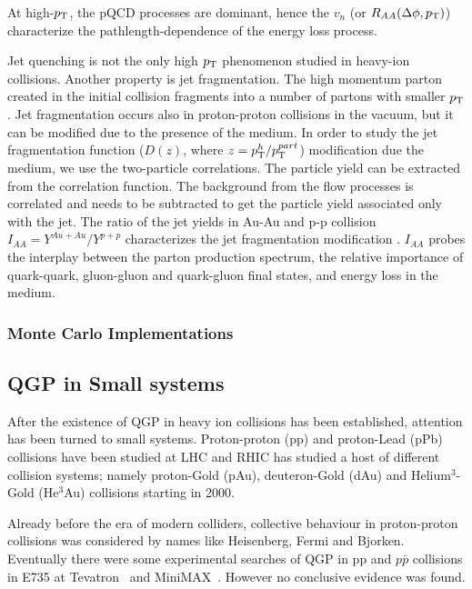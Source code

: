 At high-$p_{\rm T}$, the pQCD processes are dominant, hence the $v_n$ (or $R_{AA}(\Delta\phi, p_{\rm T})$) characterize the pathlength-dependence of the energy loss process.

Jet quenching is not the only high $p_{\rm T}$ phenomenon studied in heavy-ion collisions. Another property is jet fragmentation. The high momentum parton created in the initial collision fragments into a number of partons with smaller $p_{\rm T}$. Jet fragmentation occurs also in proton-proton collisions in the vacuum, but it can be modified due to the presence of the medium. In order to study the jet fragmentation function ($D(z)$, where $z= p_{\rm T}^h/p_{\rm T}^{part}$) modification due the medium, we use the two-particle correlations. The particle yield can be extracted from the correlation function. The background from the flow processes is correlated and needs to be subtracted to get the particle yield associated only with the jet. The ratio of the jet yields in Au-Au and p-p collision $I_{AA} = {Y^{Au+Au}}/{Y^{p+p}}$ characterizes the jet fragmentation modification \cite{Aamodt:2011vg}. $I_{AA}$ probes the interplay between the parton production spectrum, the relative importance of quark-quark, gluon-gluon and quark-gluon final states, and energy loss in the medium.
\subsubsection{Monte Carlo Implementations}


\subsection{QGP in Small systems}
After the existence of QGP in heavy ion collisions has been established, attention has been turned to small systems. Proton-proton (pp) and proton-Lead (pPb) collisions have been studied at LHC and RHIC has studied a host of different collision systems; namely proton-Gold (pAu), deuteron-Gold (dAu) and Helium$^3$-Gold (He$^3$Au) collisions starting in 2000. %

Already before the era of modern colliders, collective behaviour in proton-proton collisions was considered by names like Heisenberg, Fermi and Bjorken.~\cite{Nagle:2018nvi} Eventually there were some experimental searches of QGP in pp and $p\bar p$ collisions in E735 at Tevatron~\cite{Alexopoulos:1993wt} and MiniMAX~\cite{Brooks:1999xy}. However no conclusive evidence was found. 

